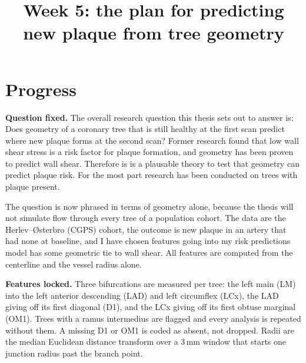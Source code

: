 \documentclass[11pt,a4paper]{article}
\title{Week 5: the plan for predicting new plaque from tree geometry}
\author{}
\date{}
\begin{document}
\maketitle

\section*{Progress}

\textbf{Question fixed.} The overall research question this thesis sets out to answer is: Does geometry of a coronary tree that is still healthy at the first scan predict where new plaque forms at the second scan? Former research found that low wall shear stress is a risk factor for plaque formation, and geometry has been proven to predict wall shear. Therefore is is a plausable theory to test that geometry can predict plaque risk. For the most part research has been conducted on trees with plaque present. 

The question is now phrased in terms of geometry alone, because the thesis will not simulate flow through every tree of a population cohort.
The data are the Herlev--{\O}sterbro (CGPS) cohort,
the outcome is new plaque in an artery that had none at baseline, and I have chosen features going into my risk predictions model has some geometric tie to wall shear. All features are computed from the centerline and the vessel radius alone.


\textbf{Features locked.} Three bifurcations are measured per tree: the left main (LM) into the left
anterior descending (LAD) and left circumflex (LCx), the LAD giving off its first diagonal (D1), and
the LCx giving off its first obtuse marginal (OM1). Trees with a ramus intermedius are flagged and
every analysis is repeated without them. A missing D1 or OM1 is coded as absent, not dropped.
Radii are the median Euclidean distance transform over a 3\,mm window that starts one junction
radius past the branch point.
\end{document}
